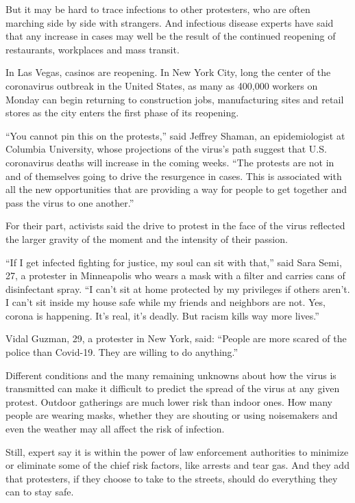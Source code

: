 But it may be hard to trace infections to other protesters, who are
often marching side by side with strangers. And infectious disease
experts have said that any increase in cases may well be the result of
the continued reopening of restaurants, workplaces and mass transit.

In Las Vegas, casinos are reopening. In New York City, long the center
of the coronavirus outbreak in the United States, as many as 400,000
workers on Monday can begin returning to construction jobs,
manufacturing sites and retail stores as the city enters the first phase
of its reopening.

``You cannot pin this on the protests,'' said Jeffrey Shaman, an
epidemiologist at Columbia University, whose projections of the virus's
path suggest that U.S. coronavirus deaths will increase in the coming
weeks. ``The protests are not in and of themselves going to drive the
resurgence in cases. This is associated with all the new opportunities
that are providing a way for people to get together and pass the virus
to one another.''

For their part, activists said the drive to protest in the face of the
virus reflected the larger gravity of the moment and the intensity of
their passion.

``If I get infected fighting for justice, my soul can sit with that,''
said Sara Semi, 27, a protester in Minneapolis who wears a mask with a
filter and carries cans of disinfectant spray. ``I can't sit at home
protected by my privileges if others aren't. I can't sit inside my house
safe while my friends and neighbors are not. Yes, corona is happening.
It's real, it's deadly. But racism kills way more lives.''

Vidal Guzman, 29, a protester in New York, said: ``People are more
scared of the police than Covid-19. They are willing to do anything.''

Different conditions and the many remaining unknowns about how the virus
is transmitted can make it difficult to predict the spread of the virus
at any given protest. Outdoor gatherings are much lower risk than indoor
ones. How many people are wearing masks, whether they are shouting or
using noisemakers and even the weather may all affect the risk of
infection.

Still, expert say it is within the power of law enforcement authorities
to minimize or eliminate some of the chief risk factors, like arrests
and tear gas. And they add that protesters, if they choose to take to
the streets, should do everything they can to stay safe.

